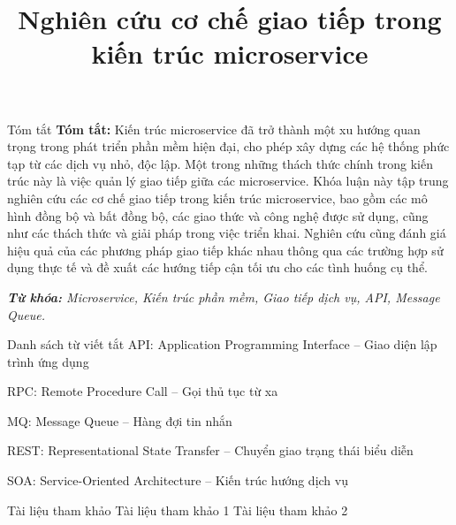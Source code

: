 \documentclass{uetgraduation}
\title{Nghiên cứu cơ chế giao tiếp trong kiến trúc microservice}
\begin{document}
\makecovers

\begin{preamble}{Tóm tắt}
    \textbf{Tóm tắt:} Kiến trúc microservice đã trở thành một xu hướng quan trọng trong phát triển phần mềm hiện đại, cho phép xây dựng các hệ thống phức tạp từ các dịch vụ nhỏ, độc lập. Một trong những thách thức chính trong kiến trúc này là việc quản lý giao tiếp giữa các microservice. Khóa luận này tập trung nghiên cứu các cơ chế giao tiếp trong kiến trúc microservice, bao gồm các mô hình đồng bộ và bất đồng bộ, các giao thức và công nghệ được sử dụng, cũng như các thách thức và giải pháp trong việc triển khai. Nghiên cứu cũng đánh giá hiệu quả của các phương pháp giao tiếp khác nhau thông qua các trường hợp sử dụng thực tế và đề xuất các hướng tiếp cận tối ưu cho các tình huống cụ thể.

    \textit{\textbf{Từ khóa:} Microservice, Kiến trúc phần mềm, Giao tiếp dịch vụ, API, Message Queue.}
\end{preamble}

\begin{contentlisting}
    \tableofcontents
    \listoffigures
    \listoftables

    \begin{contentlistingsection}{Danh sách từ viết tắt}
        API: Application Programming Interface -- Giao diện lập trình ứng dụng

        RPC: Remote Procedure Call -- Gọi thủ tục từ xa

        MQ: Message Queue -- Hàng đợi tin nhắn

        REST: Representational State Transfer -- Chuyển giao trạng thái biểu diễn

        SOA: Service-Oriented Architecture -- Kiến trúc hướng dịch vụ
    \end{contentlistingsection}
\end{contentlisting}






\begin{thebibliography}{99}
    \begin{bibsection}{Tài liệu tham khảo}
         Tài liệu tham khảo 1
         Tài liệu tham khảo 2
    \end{bibsection}
\end{thebibliography}
\end{document}
